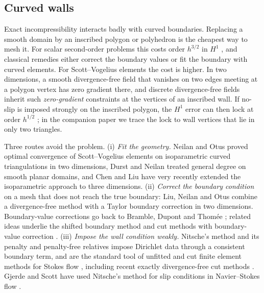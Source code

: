 \subsection{Curved walls}
Exact incompressibility interacts badly with curved boundaries. Replacing a smooth domain by an inscribed polygon or polyhedron is the cheapest way to mesh it. For scalar second-order problems this costs order $h^{3/2}$ in $H^1$ \cite{BergerScottStrang1972,Scott1975}, and classical remedies either correct the boundary values \cite{BrambleDupontThomee1972,DupontGuzmanScott2025} or fit the boundary with curved elements. For Scott--Vogelius elements the cost is higher. In two dimensions, a smooth divergence-free field that vanishes on two edges meeting at a polygon vertex has zero gradient there, and discrete divergence-free fields inherit such \emph{zero-gradient} constraints at the vertices of an inscribed wall. If no-slip is imposed strongly on the inscribed polygon, the $H^1$ error can then lock at order $h^{1/2}$ \cite{ScottPrize,GjerdeScott2024}; in the companion paper \cite{PadhiLong2D} we trace the lock to wall vertices that lie in only two triangles.

Three routes avoid the problem. (i) \emph{Fit the geometry.} Neilan and Otus \cite{NeilanOtus2021} proved optimal convergence of Scott--Vogelius elements on isoparametric curved triangulations in two dimensions, Durst and Neilan \cite{DurstNeilan2024} treated general degree on smooth planar domains, and Chen and Liu \cite{ChenLiu2026} have very recently extended the isoparametric approach to three dimensions. (ii) \emph{Correct the boundary condition} on a mesh that does not reach the true boundary: Liu, Neilan and Otus \cite{LiuNeilanOtus2023} combine a divergence-free method with a Taylor boundary correction in two dimensions. Boundary-value corrections go back to Bramble, Dupont and Thom\'ee \cite{BrambleDupontThomee1972}; related ideas underlie the shifted boundary method \cite{MainScovazzi2018} and cut methods with boundary-value correction \cite{BurmanHansboLarson2018,BurmanHansboLarson2019Stokes}. (iii) \emph{Impose the wall condition weakly.} Nitsche's method \cite{Nitsche1971,Stenberg1995,FreundStenberg1995,JuntunenStenberg2009} and its penalty and penalty-free relatives \cite{Babuska1973,Burman2012,BoiveauBurman2016} impose Dirichlet data through a consistent boundary term, and are the standard tool of unfitted and cut finite element methods for Stokes flow \cite{BurmanHansbo2014}, including recent exactly divergence-free cut methods \cite{LiuNeilanOlshanskii2023,FrachonNilssonZahedi2024,BurmanHansboLarson2024}. Gjerde and Scott have used Nitsche's method for slip conditions in Navier--Stokes flow \cite{GjerdeScott2022}.

